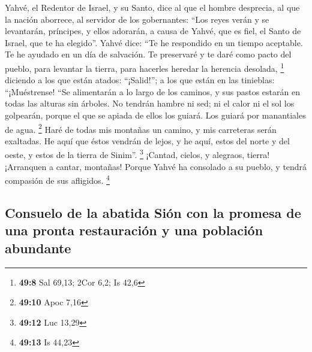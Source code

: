  Yahvé, el Redentor de Israel, y su Santo, dice al que el
hombre desprecia, al que la nación aborrece, al servidor de los
gobernantes: ``Los reyes verán y se levantarán, príncipes, y ellos
adorarán, a causa de Yahvé, que es fiel, el Santo de Israel, que te ha
elegido''.  Yahvé dice: ``Te he respondido en un tiempo
aceptable. Te he ayudado en un día de salvación. Te preservaré y te daré
como pacto del pueblo, para levantar la tierra, para hacerles heredar la
herencia desolada, \footnote{\textbf{49:8} Sal 69,13; 2Cor 6,2; Is 42,6}
 diciendo a los que están atados: ``¡Salid!''; a los que
están en las tinieblas: ``¡Muéstrense! ``Se alimentarán a lo largo de
los caminos, y sus pastos estarán en todas las alturas sin árboles.
 No tendrán hambre ni sed; ni el calor ni el sol los
golpearán, porque el que se apiada de ellos los guiará. Los guiará por
manantiales de agua. \footnote{\textbf{49:10} Apoc 7,16} 
Haré de todas mis montañas un camino, y mis carreteras serán exaltadas.
 He aquí que éstos vendrán de lejos, y he aquí, estos del
norte y del oeste, y estos de la tierra de Sinim''. \footnote{\textbf{49:12}
  Luc 13,29}  ¡Cantad, cielos, y alegraos, tierra!
¡Arranquen a cantar, montañas! Porque Yahvé ha consolado a su pueblo, y
tendrá compasión de sus afligidos. \footnote{\textbf{49:13} Is 44,23}

\hypertarget{consuelo-de-la-abatida-siuxf3n-con-la-promesa-de-una-pronta-restauraciuxf3n-y-una-poblaciuxf3n-abundante}{%
\subsection{Consuelo de la abatida Sión con la promesa de una pronta
restauración y una población
abundante}\label{consuelo-de-la-abatida-siuxf3n-con-la-promesa-de-una-pronta-restauraciuxf3n-y-una-poblaciuxf3n-abundante}}

